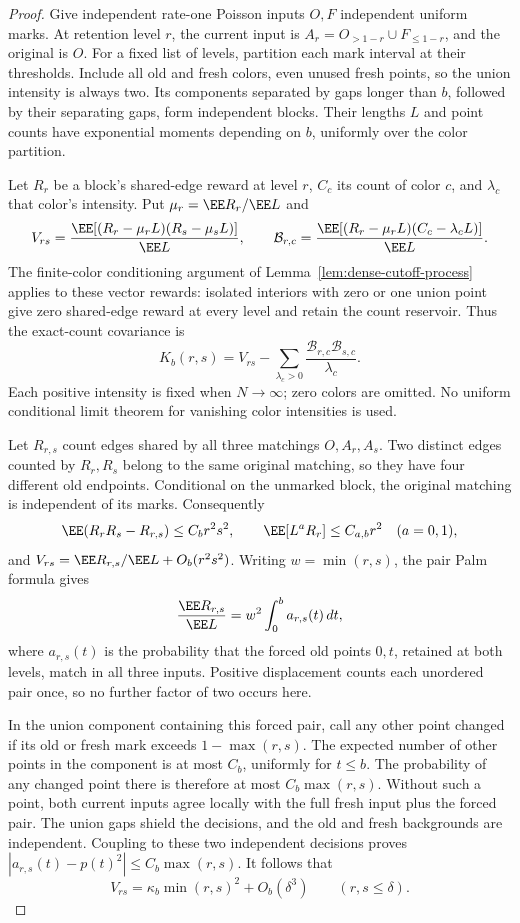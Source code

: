 \documentclass[11pt,letterpaper]{article}
\begin{document}
\begin{proof}
Give independent rate-one Poisson inputs $O,F$ independent
uniform marks. At retention level $r$, the current input is
$A_r=O_{>1-r}\cup F_{\le1-r}$, and the original is $O$.
For a fixed list of levels, partition each mark interval at
their thresholds. Include all old and fresh colors, even
unused fresh points, so the union intensity is always two.
Its components separated by gaps longer than $b$, followed
by their separating gaps, form independent blocks.
Their lengths $L$ and point counts have exponential moments
depending on $b$, uniformly over the color partition.

Let $R_r$ be a block's shared-edge reward at level $r$,
$C_c$ its count of color $c$, and $\lambda_c$ that color's
intensity. Put $\mu_r=\EE R_r/\EE L$ and
\[
 V_{rs}=\frac{\EE[(R_r-\mu_rL)(R_s-\mu_sL)]}{\EE L},
 \qquad
 \mathcal B_{r,c}=
 \frac{\EE[(R_r-\mu_rL)(C_c-\lambda_cL)]}{\EE L}.
\]
The finite-color conditioning argument of
Lemma~\ref{lem:dense-cutoff-process} applies to these vector
rewards: isolated interiors with zero or one union point
give zero shared-edge reward at every level and retain the
count reservoir. Thus the exact-count covariance is
\begin{equation}\label{eq:shared-cutoff-Schur}
 K_b(r,s)=V_{rs}
       -\sum_{\lambda_c>0}
                 \frac{\mathcal B_{r,c}\mathcal B_{s,c}}{\lambda_c}.
\end{equation}
Each positive intensity is fixed when $N\to\infty$;
zero colors are omitted. No uniform conditional limit theorem
for vanishing color intensities is used.

Let $R_{r,s}$ count edges shared by all three matchings
$O,A_r,A_s$. Two distinct edges counted by $R_r,R_s$ belong
to the same original matching, so they have four different
old endpoints. Conditional on the unmarked block, the
original matching is independent of its marks. Consequently
\[
 \EE(R_rR_s-R_{r,s})\le C_br^2s^2,\qquad
 \EE[L^aR_r]\le C_{a,b}r^2\quad(a=0,1),
\]
and
$V_{rs}=\EE R_{r,s}/\EE L+O_b(r^2s^2)$.
Writing $w=\min(r,s)$, the pair Palm formula gives
\[
 \frac{\EE R_{r,s}}{\EE L}
      =w^2\int_0^b a_{r,s}(t)\,dt,
\]
where $a_{r,s}(t)$ is the probability that the forced
old points $0,t$, retained at both levels, match in all
three inputs. Positive displacement counts each unordered
pair once, so no further factor of two occurs here.

In the union component containing this forced pair, call
any other point changed if its old or fresh mark exceeds
$1-\max(r,s)$. The expected number of other points in
the component is at most $C_b$, uniformly for $t\le b$.
The probability of any changed point there is therefore
at most $C_b\max(r,s)$.
Without such a point, both current inputs agree locally
with the full fresh input plus the forced pair.
The union gaps shield the decisions, and the old and fresh
backgrounds are independent. Coupling to these two independent
decisions proves
$|a_{r,s}(t)-p(t)^2|\le C_b\max(r,s)$.
It follows that
\begin{equation}\label{eq:upper-unconditioned-covariance}
 V_{rs}=\kappa_b\min(r,s)^2+O_b(\delta^3)
                         \qquad(r,s\le\delta).
\end{equation}


\end{proof}
\end{document}
